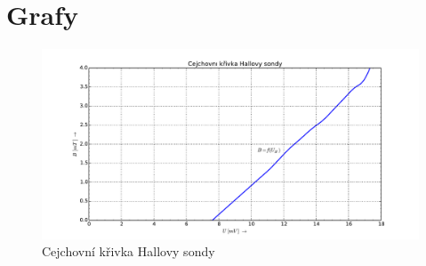 \section{Grafy}
\setcounter{figure}{0}
  \renewcommand{\figurename}{Graf č.}
  
  \begin{figure}[H]
    \centering
    \includegraphics[width=16cm]{../img/graf.pdf}
    \caption{Cejchovní křivka Hallovy sondy}
    \label{graf:1}
  \end{figure}
